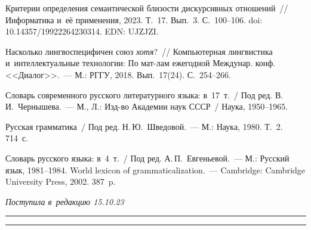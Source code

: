 \begin{multicols}{2}
{{\begin{thebibliography}{99}
 Критерии определения семантической близости 
дискурсивных отношений~// Информатика и~её применения, 2023. Т.~17. Вып.~3.  
С.~100--106. doi: 10.14357/19922264230314. EDN: UJZJZI.

 Насколько лингвоспецифичен союз \textit{хотя}?~// 
Компьютерная лингвистика и~интеллектуальные технологии: По мат-лам ежегодной 
Междунар. конф. <<Диалог>>.~--- М.: РГГУ, 2018. Вып.~17(24). С.~254--266.

Словарь современного русского литературного языка: в~17~т.~/ Под ред. 
В.\,И.~Чернышева.~--- М., Л.: Изд-во Академии наук СССР~/ Наука, 1950--1965.

Русская грамматика~/ Под ред. Н.\,Ю.~Шведовой.~--- М.: Наука, 1980.   Т.~2.
714~с.

Словарь русского языка: в~4~т.~/ Под ред. А.\,П.~Ев\-гень\-евой.~--- М.: Русский язык, 
 1981--1984. 
 World lexicon of grammaticalization.~--- Cambridge: Cambridge 
University Press, 2002. 387~p.
\end{thebibliography}

 }
 }

\end{multicols}

\vspace*{-10pt}

\hfill{\small\textit{Поступила в~редакцию 15.10.23}}

\vspace*{8pt}




\hrule

\vspace*{2pt}

\hrule



\def\tit{EVALUATING THE DEGREE OF~DISCOURSE RELATIONS SEMANTIC AFFINITY: 
METHODS AND~INSTRUMENTS}


\def\titkol{Evaluating the degree of~discourse relations semantic affinity: 
Methods and instruments}


\def\aut{O.\,Yu.~Inkova$^{1,2}$ and~M.\,G.~Kruzhkov$^1$}

\def\autkol{O.\,Yu.~Inkova and~M.\,G.~Kruzhkov}

